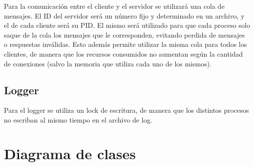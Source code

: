 \documentclass[11pt,spanish,a4paper,openany,notitlepage]{article}
\begin{document}
Para la comunicación entre el cliente y el servidor se utilizará una cola de mensajes. El ID del servidor será un número fijo y determinado en un archivo, y el de cada cliente será su PID. El mismo será utilizado para que cada proceso solo saque de la cola los mensajes que le corresponden, evitando perdida de mensajes o respuestas inválidas. Esto además permite utilizar la misma cola para todos los clientes, de manera que los recursos consumidos no aumentan según la cantidad de conexiones (salvo la memoria que utiliza cada uno de los mismos).

\subsection{Logger}

Para el logger se utiliza un lock de escritura, de manera que los distintos procesos no escriban al mismo tiempo en el archivo de log.

\newpage

\section{Diagrama de clases}
\end{document}
